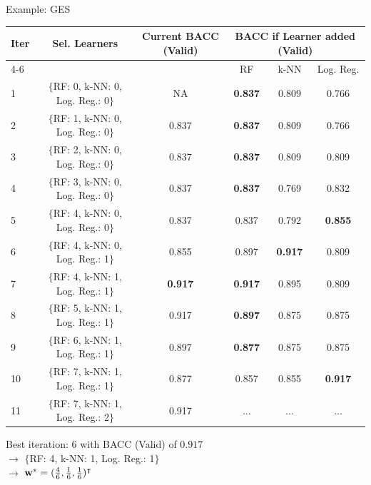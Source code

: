 \documentclass[11pt,compress,t,notes=noshow, aspectratio=169, xcolor=table]{beamer}
\begin{document}
\begin{vbframe}{Example: GES}
\begin{table}[h]
\footnotesize
\centering
\begin{tabular}{lccccc}
\hline
\textbf{Iter} & \textbf{Sel. Learners} & \textbf{Current BACC} (Valid) & \multicolumn{3}{c}{\textbf{BACC if Learner added} (Valid)}\\ \cline{4-6}
& & & RF & k-NN & Log. Reg.\\ \hline
1  & $\{$RF: 0, k-NN: 0, Log. Reg.: 0$\}$ & NA    & \textbf{0.837} & 0.809 & 0.766\\
2  & $\{$RF: 1, k-NN: 0, Log. Reg.: 0$\}$ & 0.837 & \textbf{0.837} & 0.809 & 0.766\\
3  & $\{$RF: 2, k-NN: 0, Log. Reg.: 0$\}$ & 0.837 & \textbf{0.837} & 0.809 & 0.809\\
4  & $\{$RF: 3, k-NN: 0, Log. Reg.: 0$\}$ & 0.837 & \textbf{0.837} & 0.769 & 0.832\\
5  & $\{$RF: 4, k-NN: 0, Log. Reg.: 0$\}$ & 0.837 & 0.837 & 0.792 & \textbf{0.855}\\
6  & $\{$RF: 4, k-NN: 0, Log. Reg.: 1$\}$ & 0.855 & 0.897 & \textbf{0.917} & 0.809\\
7  & $\{$RF: 4, k-NN: 1, Log. Reg.: 1$\}$ & \textbf{0.917} & \textbf{0.917} & 0.895 & 0.809\\
8  & $\{$RF: 5, k-NN: 1, Log. Reg.: 1$\}$ & 0.917 & \textbf{0.897} & 0.875 & 0.875\\
9  & $\{$RF: 6, k-NN: 1, Log. Reg.: 1$\}$ & 0.897 & \textbf{0.877} & 0.875 & 0.875\\
10 & $\{$RF: 7, k-NN: 1, Log. Reg.: 1$\}$ & 0.877 & 0.857 & 0.855 & \textbf{0.917}\\
11 & $\{$RF: 7, k-NN: 1, Log. Reg.: 2$\}$ & 0.917 & ... & ... & ...\\
\hline
\end{tabular}
\label{table:learners_valid_test}
\end{table}
Best iteration: 6 with BACC (Valid) of $0.917$\\
$\rightarrow$ $\{$RF: 4, k-NN: 1, Log. Reg.: 1$\}$\\
$\rightarrow$ $\mathbf{w}^{*} = (\frac{4}{6}, \frac{1}{6}, \frac{1}{6})^\intercal$
\end{vbframe}

\end{document}
